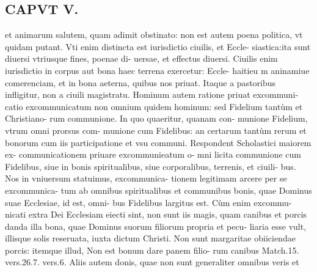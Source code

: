 \documentclass{article}
\begin{document}
\begin{pages}
\section*{CAPVT  V. }
\marginpar{[ p.401 ]}\pstart et animarum salutem, quam adimit obstinato: non est autem poena politica, vt quidam putant. Vti enim distincta est iurisdictio ciuilis, et Eccle- siastica:ita sunt diuersi vtriusque fines, poenae di- uersae, et effectus diuersi. Ciuilis enim iurisdictio in corpus aut bona haec terrena exercetur: Eccle- haitieu m aninamiue comerenciam, et in bona aeterna, quibus nos priuat. Itaque a pastoribus infligitur, non a ciuili magistratu.  \pend\pstart Hominum autem ratione priuat excommuni- catio excommunicatum non omnium quidem hominum: sed Fidelium tantùm et Christiano- rum communione. In quo quaeritur, quanam con- munione Fidelium, vtrum omni prorsus com- munione cum Fidelibus: an certarum tantùm rerum et bonorum cum iis participatione et vsu communi. Respondent Scholastici maiorem ex- communicationem priuare excommunieatum o- mni licita communione cum Fidelibus, siue in bonis spiritualibus, siue corporalibus, terrenis, et ciuili- bus. Nos in vniuersum statuimus, excommunica- tionem legitimam arcere per se excommunica- tum ab omnibus spiritualibus et communibus bonis, quae Dominus suae Ecclesiae, id est, omni- bus Fidelibus largitus est. Cùm enim excommu- nicati extra Dei Ecclesiam eiecti sint, non sunt iis magis, quam canibus et porcis danda illa bona, quae Dominus suorum filiorum propria et pecu- liaria esse vult, illisque solis reseruata, iuxta dictum Christi. Non sunt margaritae obiiciendae porcis: itemque illud, Non est bonum dare panem filio- rum canibus Match.15. vers.26.7. vers.6. Aliis autem donis, quae non sunt generaliter omnibus veris et  \pend

\end{pages}
\end{document}
